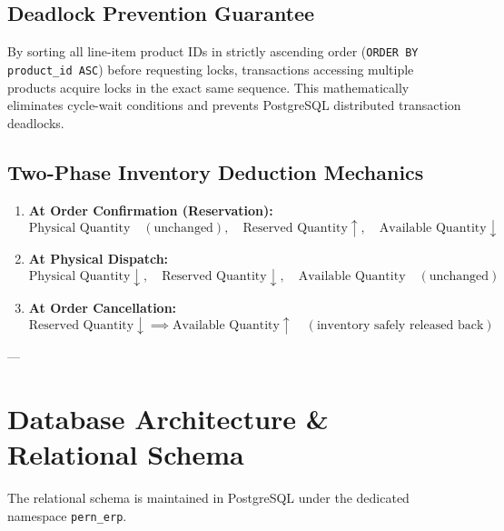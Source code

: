 \documentclass[11pt,a4paper]{article}
\begin{document}
\subsection{Deadlock Prevention Guarantee}
By sorting all line-item product IDs in strictly ascending order (\texttt{ORDER BY product\_id ASC}) before requesting locks, transactions accessing multiple products acquire locks in the exact same sequence. This mathematically eliminates cycle-wait conditions and prevents PostgreSQL distributed transaction deadlocks.

\subsection{Two-Phase Inventory Deduction Mechanics}
\begin{enumerate}[itemsep=0.3em]
    \item \textbf{At Order Confirmation (Reservation):}
    \begin{equation}
    \text{Physical Quantity} \quad (\text{unchanged}), \quad \text{Reserved Quantity} \uparrow, \quad \text{Available Quantity} \downarrow
    \end{equation}
    \item \textbf{At Physical Dispatch:}
    \begin{equation}
    \text{Physical Quantity} \downarrow, \quad \text{Reserved Quantity} \downarrow, \quad \text{Available Quantity} \quad (\text{unchanged})
    \end{equation}
    \item \textbf{At Order Cancellation:}
    \begin{equation}
    \text{Reserved Quantity} \downarrow \implies \text{Available Quantity} \uparrow \quad (\text{inventory safely released back})
    \end{equation}
\end{enumerate}

---

\section{Database Architecture \& Relational Schema}

The relational schema is maintained in PostgreSQL under the dedicated namespace \texttt{pern\_erp}.
\end{document}
